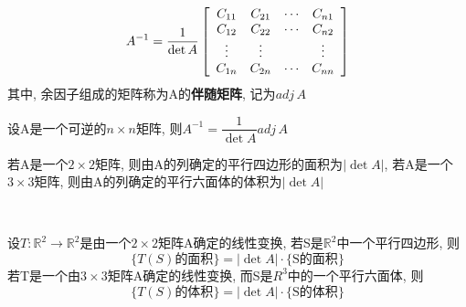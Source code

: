 \[A^{-1}=\frac{1}{\det A}\left[\begin{array}{c c c c}
C_{11} & C_{21} & \cdots & C_{n1}\\
C_{12} & C_{22} & \cdots & C_{n2}\\
\vdots & \vdots & & \vdots\\
C_{1n} & C_{2n} & \cdots & C_{nn}
\end{array}\right]\]
其中, 余因子组成的矩阵称为A的\textbf{伴随矩阵}, 记为$adj\,A$\\[2ex]

\begin{TheoremTwo}[逆矩阵公式]
设A是一个可逆的$n\times n$矩阵, 则$A^{-1}=\dfrac{1}{\det A}adj\,A$
\end{TheoremTwo}\vspace{4ex}

\begin{TheoremOne}
若A是一个$2\times 2$矩阵, 则由A的列确定的平行四边形的面积为$|\det A|$, 若A是一个$3\times 3$矩阵, 则由A的列确定的平行六面体的体积为$|\det A|$
\end{TheoremOne}\vspace{4ex}

\\[2ex]

\begin{TheoremOne}
设$T:\mathbb{R}^2\rightarrow\mathbb{R}^2$是由一个$2\times 2$矩阵A确定的线性变换, 若S是$\mathbb{R}^2$中一个平行四边形, 则
\[\{T(S)\text{的面积}\}=|\det A|\cdot\{\text{S的面积}\}\]
若T是一个由$3\times 3$矩阵A确定的线性变换, 而S是$R^3$中的一个平行六面体, 则
\[\{T(S)\text{的体积}\}=|\det A|\cdot\{\text{S的体积}\}\]
\end{TheoremOne}
